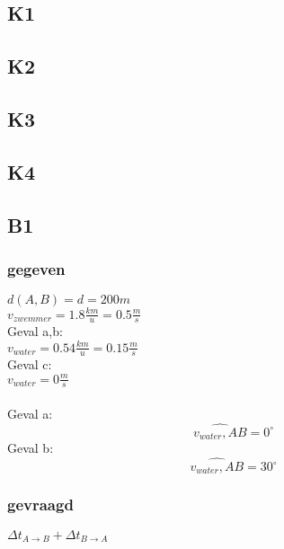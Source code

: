 \documentclass[10pt,a4paper]{article}
\begin{document}
\subsection{K1}

\subsection{K2}

\subsection{K3}

\subsection{K4}

\subsection{B1}
\subsubsection*{gegeven}
$d(A,B) = d = 200m$\\
$v_{zwemmer}=1.8\frac{km}{u}=0.5\frac{m}{s}$\\
Geval a,b:\\
$v_{water}= 0.54\frac{km}{u}=0.15\frac{m}{s}$\\
Geval c:\\
$v_{water}= 0\frac{m}{s}$\\\\
Geval a: \[\widehat{v_{water},AB} = 0^\circ\]
Geval b: \[\widehat{v_{water},AB} = 30^\circ\]

\subsubsection*{gevraagd}
$\Delta t_{A\rightarrow B} + \Delta t_{B\rightarrow A}$
\end{document}
